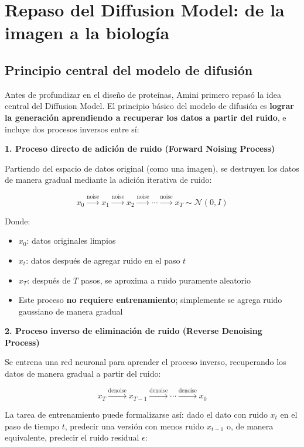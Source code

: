 \section{Repaso del Diffusion Model: de la imagen a la biología}

\subsection{Principio central del modelo de difusión}

Antes de profundizar en el diseño de proteínas, Amini primero repasó la idea central del Diffusion Model. El principio básico del modelo de difusión es \textbf{lograr la generación aprendiendo a recuperar los datos a partir del ruido}, e incluye dos procesos inversos entre sí:

\textbf{1. Proceso directo de adición de ruido (Forward Noising Process)}

Partiendo del espacio de datos original (como una imagen), se destruyen los datos de manera gradual mediante la adición iterativa de ruido:

$$x_0 \xrightarrow{\text{noise}} x_1 \xrightarrow{\text{noise}} x_2 \xrightarrow{\text{noise}} \cdots \xrightarrow{\text{noise}} x_T \sim \mathcal{N}(0, I)$$

Donde:
\begin{itemize}
    \item $x_0$: datos originales limpios
    \item $x_t$: datos después de agregar ruido en el paso $t$
    \item $x_T$: después de $T$ pasos, se aproxima a ruido puramente aleatorio
    \item Este proceso \textbf{no requiere entrenamiento}; simplemente se agrega ruido gaussiano de manera gradual
\end{itemize}

\textbf{2. Proceso inverso de eliminación de ruido (Reverse Denoising Process)}

Se entrena una red neuronal para aprender el proceso inverso, recuperando los datos de manera gradual a partir del ruido:

$$x_T \xrightarrow{\text{denoise}} x_{T-1} \xrightarrow{\text{denoise}} \cdots \xrightarrow{\text{denoise}} x_0$$

La tarea de entrenamiento puede formalizarse así: dado el dato con ruido $x_t$ en el paso de tiempo $t$, predecir una versión con menos ruido $x_{t-1}$ o, de manera equivalente, predecir el ruido residual $\epsilon$:

